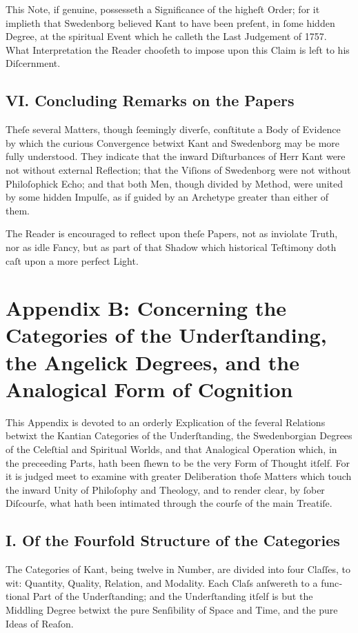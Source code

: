 \documentclass[12pt]{article}
\begin{document}
This Note, if genuine, possesseth a Significance of the higheſt Order; for it 
implieth that Swedenborg believed Kant to have been preſent, in ſome hidden 
Degree, at the spiritual Event which he calleth the Last Judgement of 1757. 
What Interpretation the Reader chooſeth to impose upon this Claim is left to 
his Diſcernment.

\subsection*{VI. Concluding Remarks on the Papers}
Theſe several Matters, though ſeemingly diverſe, conſtitute a Body of Evidence 
by which the curious Convergence betwixt Kant and Swedenborg may be more fully 
understood. They indicate that the inward Diſturbances of Herr Kant were not 
without external Reflection; that the Viſions of Swedenborg were not without 
Philoſophick Echo; and that both Men, though divided by Method, were united by 
some hidden Impulſe, as if guided by an Archetype greater than either of them.

The Reader is encouraged to reflect upon theſe Papers, not as inviolate Truth, 
nor as idle Fancy, but as part of that Shadow which historical Teſtimony 
doth caſt upon a more perfect Light.

\newpage

\section*{Appendix B: Concerning the Categories of the Underſtanding, the Angelick Degrees, and the Analogical Form of Cognition}

This Appendix is devoted to an orderly Explication of the ſeveral Relations 
betwixt the Kantian Categories of the Underſtanding, the Swedenborgian Degrees 
of the Celeſtial and Spiritual Worlds, and that Analogical Operation which, in 
the preceeding Parts, hath been ſhewn to be the very Form of Thought itſelf. 
For it is judged meet to examine with greater Deliberation thoſe Matters which 
touch the inward Unity of Philoſophy and Theology, and to render clear, by 
ſober Diſcourſe, what hath been intimated through the courſe of the main 
Treatiſe.

\subsection*{I. Of the Fourfold Structure of the Categories}
The Categories of Kant, being twelve in Number, are divided into four Claſſes, 
to wit: Quantity, Quality, Relation, and Modality. Each Claſs anſwereth to a 
func­tional Part of the Underſtanding; and the Underſtanding itſelf is but the 
Middling Degree betwixt the pure Senſibility of Space and Time, and the pure 
Ideas of Reaſon.
\end{document}
